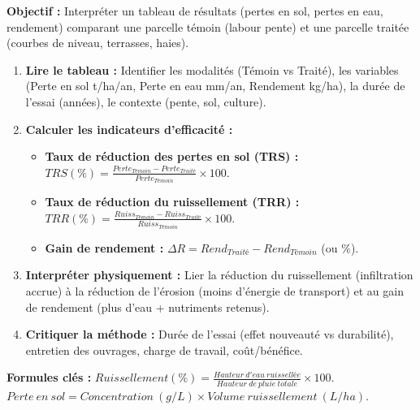 \documentclass[11pt]{article}
\begin{document}
\begin{methode}
    \textbf{Objectif :} Interpréter un tableau de résultats (pertes en sol, pertes en eau, rendement) comparant une parcelle témoin (labour pente) et une parcelle traitée (courbes de niveau, terrasses, haies).
    \begin{enumerate}
        \item \textbf{Lire le tableau :} Identifier les modalités (Témoin vs Traité), les variables (Perte en sol t/ha/an, Perte en eau mm/an, Rendement kg/ha), la durée de l'essai (années), le contexte (pente, sol, culture).
        \item \textbf{Calculer les indicateurs d'efficacité :}
        \begin{itemize}
            \item \textbf{Taux de réduction des pertes en sol (TRS) :} $TRS(\%) = \frac{Perte_{Témoin} - Perte_{Traité}}{Perte_{Témoin}} \times 100$.
            \item \textbf{Taux de réduction du ruissellement (TRR) :} $TRR(\%) = \frac{Ruiss_{Témoin} - Ruiss_{Traité}}{Ruiss_{Témoin}} \times 100$.
            \item \textbf{Gain de rendement :} $\Delta R = Rend_{Traité} - Rend_{Témoin}$ (ou $\%$).
        \end{itemize}
        \item \textbf{Interpréter physiquement :} Lier la réduction du ruissellement (infiltration accrue) à la réduction de l'érosion (moins d'énergie de transport) et au gain de rendement (plus d'eau + nutriments retenus).
        \item   \textbf{Critiquer la méthode :} Durée de l'essai (effet nouveauté vs durabilité), entretien des ouvrages, charge de travail, coût/bénéfice.
    \end{enumerate}
    \textbf{Formules clés :} $Ruissellement (\%) = \frac{Hauteur\ d'eau\ ruissellée}{Hauteur\ de\ pluie\ totale} \times 100$. $Perte\ en\ sol = Concentration\ (g/L) \times Volume\ ruissellement\ (L/ha)$.
\end{methode}
\end{document}
